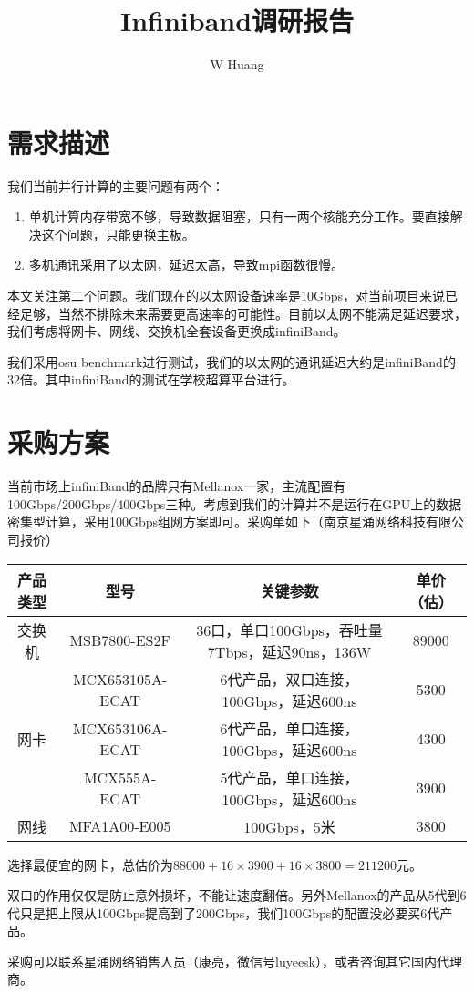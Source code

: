 \documentclass[lang=cn,11pt,a4paper]{elegantpaper}
\title{Infiniband调研报告}
\author{W Huang}
\date{\zhtoday}
\begin{document}
\maketitle

\section{需求描述}

我们当前并行计算的主要问题有两个：

\begin{enumerate}
    \item 单机计算内存带宽不够，导致数据阻塞，只有一两个核能充分工作。要直接解决这个问题，只能更换主板。
    \item 多机通讯采用了以太网，延迟太高，导致mpi函数很慢。
\end{enumerate}

本文关注第二个问题。我们现在的以太网设备速率是10Gbps，对当前项目来说已经足够，当然不排除未来需要更高速率的可能性。目前以太网不能满足延迟要求，我们考虑将网卡、网线、交换机全套设备更换成infiniBand。

我们采用osu benchmark进行测试，我们的以太网的通讯延迟大约是infiniBand的32倍。其中infiniBand的测试在学校超算平台进行。

\section{采购方案}

当前市场上infiniBand的品牌只有Mellanox一家，主流配置有100Gbps/200Gbps/400Gbps三种。考虑到我们的计算并不是运行在GPU上的数据密集型计算，采用100Gbps组网方案即可。采购单如下（南京星涌网络科技有限公司报价）

\begin{table}[H]
    \begin{tabular}{|c|c|c|c|}
    \hline
    \textbf{产品类型}       & \textbf{型号}     & \textbf{关键参数}                      & \textbf{单价（估）} \\ \hline
    交换机                 & MSB7800-ES2F    & 36口，单口100Gbps，吞吐量7Tbps，延迟90ns，136W & 89000          \\ \hline
    \multirow{3}{*}{网卡} & MCX653105A-ECAT & 6代产品，双口连接，100Gbps，延迟600ns          & 5300           \\ \cline{2-4} 
                        & MCX653106A-ECAT & 6代产品，单口连接，100Gbps，延迟600ns          & 4300           \\ \cline{2-4} 
                        & MCX555A-ECAT    & 5代产品，单口连接，100Gbps，延迟600ns          & 3900           \\ \hline
    网线                  & MFA1A00-E005    & 100Gbps，5米                         & 3800           \\ \hline
    \end{tabular}
\end{table}

选择最便宜的网卡，总估价为$88000+16\times 3900+16\times3800=211200$元。

双口的作用仅仅是防止意外损坏，不能让速度翻倍。另外Mellanox的产品从5代到6代只是把上限从100Gbps提高到了200Gbps，我们100Gbps的配置没必要买6代产品。

采购可以联系星涌网络销售人员（康亮，微信号luyeesk），或者咨询其它国内代理商。

\appendix
\addappheadtotoc
\end{document}
